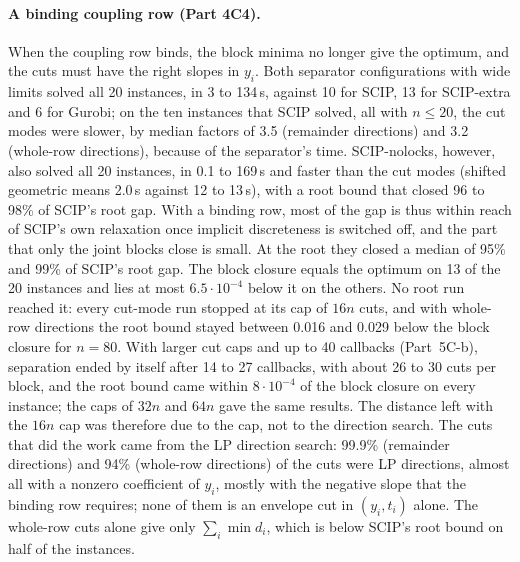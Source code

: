 \paragraph{A binding coupling row (Part 4C4).} When the coupling row binds,
the block minima no longer give the optimum, and the cuts must have the right
slopes in $y_i$. Both separator configurations with wide limits solved all 20
instances, in 3 to 134\,s, against 10 for SCIP, 13 for SCIP-extra and 6 for
Gurobi; on the ten instances that SCIP solved, all with $n\le20$, the cut modes
were slower, by median factors of 3.5 (remainder directions) and 3.2
(whole-row directions), because of the separator's time. SCIP-nolocks,
however, also solved all 20 instances, in 0.1 to 169\,s and faster than the
cut modes (shifted geometric means 2.0\,s against 12 to 13\,s), with a root
bound that closed 96 to 98\% of SCIP's root gap. With a binding row, most of
the gap is thus within reach of SCIP's own relaxation once implicit
discreteness is switched off, and the part that only the joint blocks close is
small.
At the root they closed a median of 95\% and 99\% of SCIP's root gap. The
block closure equals the optimum on 13 of the 20 instances and lies at most
$6.5\cdot10^{-4}$ below it on the others. No root run reached it: every
cut-mode run stopped at its cap of $16n$ cuts, and with whole-row directions
the root bound stayed between 0.016 and 0.029 below the block closure for
$n=80$. With larger cut caps and up to 40 callbacks (Part~5C-b), separation
ended by itself after 14 to 27 callbacks, with about 26 to 30 cuts per block,
and the root bound came within $8\cdot10^{-4}$ of the block closure on every
instance; the caps of $32n$ and $64n$ gave the same results. The distance left
with the $16n$ cap was therefore due to the cap, not to the direction search.
The cuts that did the work came from the LP direction
search: 99.9\% (remainder directions) and 94\% (whole-row directions) of the
cuts were LP directions, almost all with a nonzero coefficient of $y_i$, mostly
with the negative slope that the binding row requires; none of them is an
envelope cut in $(y_i,t_i)$ alone. The whole-row cuts alone give only
$\sum_i\min d_i$, which is below SCIP's root bound on half of the instances.

